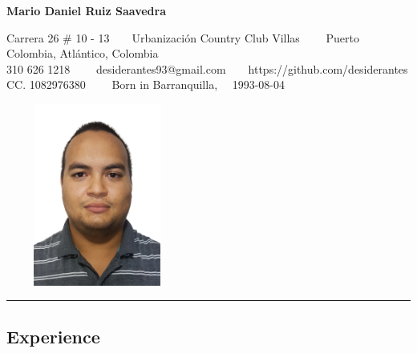 \documentclass[10pt,a4paper]{article}
\begin{document}
\begin{center}
{\LARGE \textbf{Mario Daniel Ruiz Saavedra}}

Carrera 26 \# 10 - 13\ \ 
\ \ Urbanización Country Club Villas\ \ \textbullet
\ \ Puerto Colombia, Atlántico, Colombia
\\
310 626 1218\ \ \textbullet
\ \ desiderantes93@gmail.com\ \ \textbullet \ \ https://github.com/desiderantes
\\
CC. 1082976380 \ \ \textbullet \ \ Born in Barranquilla, \ \ 1993-08-04


\vspace{0.4em}
\includegraphics [width=6cm,height=6cm,keepaspectratio]{Foto.jpg}
\end{center}
\hrule
\vspace{-0.4em}
\subsection*{Experience}
\end{document}
